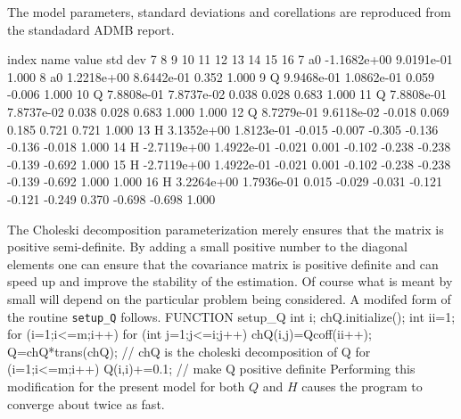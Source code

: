 The model parameters, standard deviations and 
corellations are reproduced from the
standadard ADMB report.

\beginexample
\obeylines
\stt
 index   name    value      std dev    7      8      9     10     11     12     13     14     15      16   
    7   a0    -1.1682e+00 9.0191e-01  1.000
    8   a0     1.2218e+00 8.6442e-01  0.352  1.000
    9   Q      9.9468e-01 1.0862e-01  0.059 -0.006  1.000
   10   Q      7.8808e-01 7.8737e-02  0.038  0.028  0.683  1.000
   11   Q      7.8808e-01 7.8737e-02  0.038  0.028  0.683  1.000  1.000
   12   Q      8.7279e-01 9.6118e-02 -0.018  0.069  0.185  0.721  0.721  1.000
   13   H      3.1352e+00 1.8123e-01 -0.015 -0.007 -0.305 -0.136 -0.136 -0.018  1.000
   14   H     -2.7119e+00 1.4922e-01 -0.021  0.001 -0.102 -0.238 -0.238 -0.139 -0.692  1.000
   15   H     -2.7119e+00 1.4922e-01 -0.021  0.001 -0.102 -0.238 -0.238 -0.139 -0.692  1.000  1.000
   16   H      3.2264e+00 1.7936e-01  0.015 -0.029 -0.031 -0.121 -0.121 -0.249  0.370 -0.698 -0.698  1.000
\endexample
{}

The Choleski decomposition parameterization merely ensures that the 
matrix is positive semi-definite. By adding a small positive number to the
diagonal elements one can ensure that the covariance matrix is
positive definite and can speed up and improve the stability of the
estimation. Of course what is meant by small will depend on the
particular problem being considered. 
A modifed form of the routine {\tt setup\_Q}
follows.
\beginexample
FUNCTION setup_Q
  int i;
  chQ.initialize();
  int ii=1;
  for (i=1;i<=m;i++)
    for (int j=1;j<=i;j++)
      chQ(i,j)=Qcoff(ii++);
  Q=chQ*trans(chQ);   // chQ is the choleski decomposition of Q 
  for (i=1;i<=m;i++)
    Q(i,i)+=0.1;   // make Q positive definite
\endexample
Performing this modification for the present model for both $Q$ and
$H$ causes the program to converge about twice as fast.

